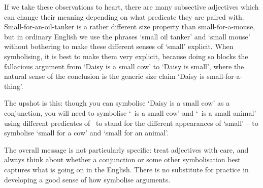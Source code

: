 If we take these observations to heart, there are many subsective adjectives which can change their meaning depending on what predicate they are paired with. Small-for-an-oil-tanker is a rather different size property than small-for-a-mouse, but in ordinary English we use the phrases `small oil tanker' and `small mouse' without bothering to make these different senses of `small' explicit. When symbolising, it is best to make them very explicit, because doing so blocks the fallacious argument from `Daisy is a small cow' to `Daisy is small', where the natural sense of the conclusion is the generic size claim `Daisy is small-for-a-thing'. 

The upshot is this: though you can symbolise `Daisy is a small cow' as a conjunction, you will need to symbolise `\blank\ is a small cow' and `\blank\ is a small animal' using different predicates of \FOL\ to stand for the different appearances of `small' – to symbolise `small for a cow' and `small for an animal'. 

The overall message is not particularly specific: treat adjectives with care, and always think about whether a conjunction or some other symbolisation best captures what is going on in the English. There is no substitute for practice in developing a good sense of how symbolise arguments. 

